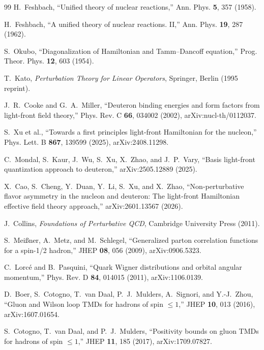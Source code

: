 \documentclass[11pt]{article}
\begin{document}
\begin{thebibliography}{99}
H.~Feshbach,
``Unified theory of nuclear reactions,''
Ann. Phys. \textbf{5}, 357 (1958).

H.~Feshbach,
``A unified theory of nuclear reactions. II,''
Ann. Phys. \textbf{19}, 287 (1962).

S.~Okubo,
``Diagonalization of Hamiltonian and Tamm--Dancoff equation,''
Prog. Theor. Phys. \textbf{12}, 603 (1954).

T.~Kato,
\emph{Perturbation Theory for Linear Operators},
Springer, Berlin (1995 reprint).

J.~R.~Cooke and G.~A.~Miller,
``Deuteron binding energies and form factors from light-front field theory,''
Phys. Rev. C \textbf{66}, 034002 (2002),
arXiv:nucl-th/0112037.

S.~Xu et al.,
``Towards a first principles light-front Hamiltonian for the nucleon,''
Phys. Lett. B \textbf{867}, 139599 (2025),
arXiv:2408.11298.

C.~Mondal, S.~Kaur, J.~Wu, S.~Xu, X.~Zhao, and J.~P.~Vary,
``Basis light-front quantization approach to deuteron,''
arXiv:2505.12889 (2025).

X.~Cao, S.~Cheng, Y.~Duan, Y.~Li, S.~Xu, and X.~Zhao,
``Non-perturbative flavor asymmetry in the nucleon and deuteron: The
light-front Hamiltonian effective field theory approach,''
arXiv:2601.13567 (2026).

J.~Collins,
\emph{Foundations of Perturbative QCD},
Cambridge University Press (2011).

S.~Mei{\ss}ner, A.~Metz, and M.~Schlegel,
``Generalized parton correlation functions for a spin-1/2 hadron,''
JHEP \textbf{08}, 056 (2009),
arXiv:0906.5323.

C.~Lorc\'e and B.~Pasquini,
``Quark Wigner distributions and orbital angular momentum,''
Phys. Rev. D \textbf{84}, 014015 (2011),
arXiv:1106.0139.

D.~Boer, S.~Cotogno, T.~van Daal, P.~J.~Mulders, A.~Signori, and
Y.-J.~Zhou,
``Gluon and Wilson loop TMDs for hadrons of spin \(\le1\),''
JHEP \textbf{10}, 013 (2016),
arXiv:1607.01654.

S.~Cotogno, T.~van Daal, and P.~J.~Mulders,
``Positivity bounds on gluon TMDs for hadrons of spin \(\le1\),''
JHEP \textbf{11}, 185 (2017),
arXiv:1709.07827.

\end{thebibliography}
\end{document}
